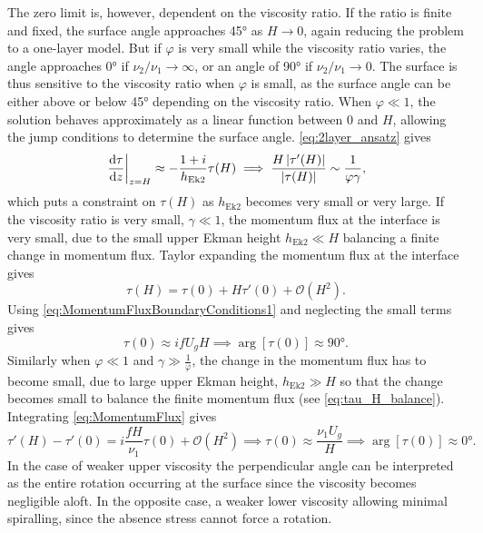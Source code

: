 The zero limit is, however, dependent on the viscosity ratio. If the ratio is finite and fixed, the surface angle approaches \ang{45} as $H \rightarrow 0$, again reducing the problem to a one-layer model. But if $\varphi$ is very small while the viscosity ratio varies, the angle approaches \ang{0} if $\nu_2 / \nu_1 \rightarrow \infty$, or an angle of \ang{90} if $\nu_2/\nu_1 \rightarrow 0$. The surface is thus sensitive to the viscosity ratio when $ \varphi $ is small, as the surface angle can be either above or below \ang{45} depending on the viscosity ratio. When $ \varphi \ll 1 $, the solution behaves approximately as a linear function between $0$ and $H$, allowing the jump conditions to determine the surface angle. \autoref{eq:2layer_ansatz} gives
\begin{equation}
\left.\frac{\mathrm{d}\tau}{\mathrm{d}z}\right|_{z=H} \approx - \frac{1+i}{h_\text{Ek2}} \tau(H) \implies \frac{H\left| \tau'(H) \right|}{\left| \tau(H) \right|}\sim\frac{1}{\varphi\gamma},
\label{eq:tau_H_balance}
\end{equation}
which puts a constraint on $\tau(H)$ as $h_\text{Ek2}$ becomes very small or very large. If the viscosity ratio is very small, $\gamma\ll1$, the momentum flux at the interface is very small, due to the small upper Ekman height $h_\text{Ek2}\ll H$ balancing a finite change in momentum flux. Taylor expanding the momentum flux at the interface gives 
\begin{equation}
    \tau(H)=\tau(0)+H\tau'(0)+\mathcal{O}\left(H^2\right).
\end{equation}
Using \autoref{eq:MomentumFluxBoundaryConditions1} and neglecting the small terms gives 
\begin{equation}
    \tau(0)\approx ifU_gH \implies \arg[\tau(0)]\approx\ang{90}. 
\end{equation}
Similarly when $ \varphi \ll 1 $ and $\gamma\gg\tfrac{1}{\varphi}$, the change in the momentum flux has to become small, due to large upper Ekman height, $h_\text{Ek2}\gg H$ so that the change becomes small to balance the finite momentum flux (see \autoref{eq:tau_H_balance}). Integrating \autoref{eq:MomentumFlux} gives 
\begin{equation}
    \tau'(H)-\tau'(0)= i\frac{fH}{\nu_1}\tau(0)+\mathcal{O}\left(H^2\right) \implies \tau(0)\approx \frac{\nu_1 U_g}{H} \implies \arg[\tau(0)]\approx\ang{0}. 
\end{equation}
In the case of weaker upper viscosity the perpendicular angle can be interpreted as the entire rotation occurring at the surface since the viscosity becomes negligible aloft. In the opposite case, a weaker lower viscosity allowing minimal spiralling, since the absence stress cannot force a rotation. 

